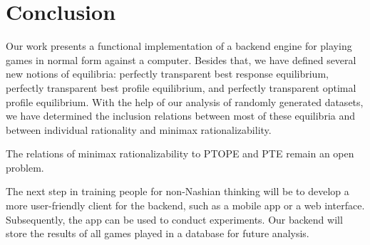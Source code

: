 \chapter{Conclusion}
Our work presents a functional implementation of a backend engine for playing games in normal form against a computer.
Besides that, we have defined several new notions of equilibria: perfectly transparent best response equilibrium, perfectly transparent best profile equilibrium, and perfectly transparent optimal profile equilibrium.
With the help of our analysis of randomly generated datasets, we have determined the inclusion relations between most of these equilibria and between individual rationality and minimax rationalizability.

The relations of minimax rationalizability to PTOPE and PTE remain an open problem.

The next step in training people for non-Nashian thinking will be to develop a more user-friendly client for the backend, such as a mobile app or a web interface.
Subsequently, the app can be used to conduct experiments.
Our backend will store the results of all games played in a database for future analysis.
